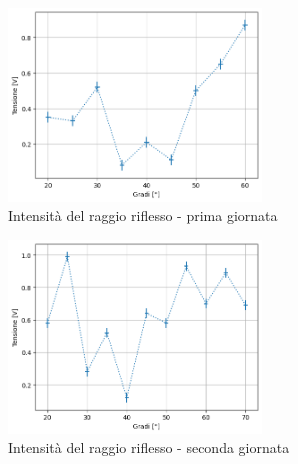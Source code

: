 \documentclass[letterpaper,12pt]{article}
\begin{document}
\begin{figure}[h!]
	\centering
	\includegraphics[width = 0.6\textwidth]{riflesso1.png}
	\caption{Intensità del raggio riflesso - prima giornata}
	\label{fig:riflesso1}
\end{figure}

\begin{figure}[h!]
	\centering
	\includegraphics[width = 0.6\textwidth]{riflesso2.png}
	\caption{Intensità del raggio riflesso - seconda giornata}
	\label{fig:riflesso2}
\end{figure}
\end{document}
